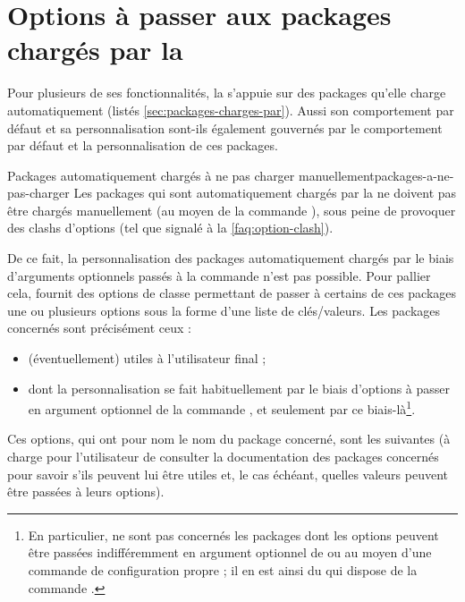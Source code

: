 \section{Options à passer aux packages chargés par la \yatcl{}}
\label{sec:options-passer-aux}

Pour plusieurs de ses fonctionnalités, la \yatcl s'appuie sur des packages
qu'elle charge automatiquement (listés
\vref{sec:packages-charges-par}). Aussi son comportement par défaut et sa
personnalisation sont-ils également gouvernés par le comportement par défaut et
la personnalisation de ces packages.

\begin{dbwarning}{Packages automatiquement chargés à ne pas charger
    manuellement}{packages-a-ne-pas-charger}
  Les packages qui sont automatiquement chargés par la \yatcl{} ne doivent pas
  être chargés manuellement (au moyen de la commande
  ), sous peine de provoquer des clashs d'options
  (tel que signalé à la \vref{faq:option-clash}).
\end{dbwarning}

De ce fait, la personnalisation des packages automatiquement chargés par le
biais d'arguments optionnels passés à la commande 
n'est pas possible. Pour pallier cela, \yat{} fournit des options de classe
permettant de passer à certains de ces packages une ou plusieurs options sous
la forme d'une liste de clés/valeurs. Les packages concernés sont précisément
ceux :
\begin{itemize}
\item (éventuellement) utiles à l'utilisateur final ;
\item dont la personnalisation se fait habituellement par le biais d'options
  à passer en argument optionnel de la commande , et
  seulement par ce biais-là\footnote{En particulier, ne sont pas concernés les
    packages dont les options peuvent être passées indifféremment en argument
    optionnel de \protect{} ou au moyen d'une commande
    de configuration propre ; il en est ainsi du  qui dispose
    de la commande \protect{}.}.
\end{itemize}
Ces options, qui ont pour nom le nom du package concerné, sont les suivantes (à
charge pour l'utilisateur de consulter la documentation des packages concernés
pour savoir s'ils peuvent lui être utiles et, le cas échéant, quelles valeurs
peuvent être passées à leurs options).

